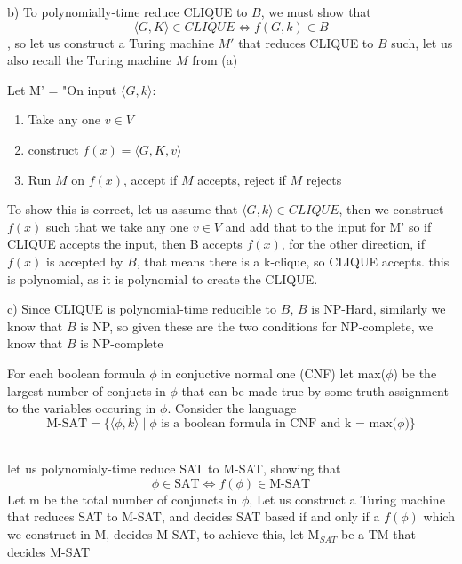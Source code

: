\documentclass[a4paper,addpoints
	]{exam}
\begin{document}
\begin{questions}
\begin{solutionbox}{}
    \vspace{2em}

    b) To polynomially-time reduce CLIQUE to $B$, we must show that 
    \[
	    \langle G,K\rangle \in CLIQUE \iff f(G,k) \in B
    \]
    , so let us construct a Turing machine $M'$ that reduces CLIQUE to $B$ such, let us also recall the Turing machine $M$ from (a)
    
    \vspace{2em}
    
    Let M' = "On input $\langle G,k\rangle$:
    \begin{enumerate}
        \item Take any one $v\in V$
        \item construct $f(x) = \langle G,K,v\rangle$
        \item Run $M$ on $f(x)$, accept if $M$ accepts, reject if $M$ rejects
    \end{enumerate}

    \vspace{2em}

    To show this is correct, let us assume that $\langle G,k\rangle \in CLIQUE$, then we construct $f(x)$ such that we take any one $v \in V$ and add that to the input for M' so if CLIQUE accepts the input,
    then B accepts $f(x)$, for the other direction, if $f(x)$ is accepted by $B$, that means there is a k-clique, so CLIQUE accepts. this is polynomial, as it is polynomial to create the CLIQUE.

    \vspace{2em}

    c) Since CLIQUE is polynomial-time reducible to $B$, $B$ is NP-Hard, similarly we know that $B$ is NP, so given these are the two conditions for NP-complete, we know that $B$ is NP-complete
    \end{solutionbox}
    
    \pagebreak
    
    \question[20] For each boolean formula $\phi$ in conjuctive normal one (CNF) let max($\phi$) be the largest number of conjucts in $\phi$ that can be made true by some truth assignment to the variables occuring in $\phi$.
    Consider the language 
    \[
    \text{M-SAT} = \{\langle \phi, k\rangle \mid \phi \text{ is a boolean formula in CNF and k = max($\phi$)}\}
	\]
   \begin{solutionbox}{} \\
    
    let us polynomialy-time reduce SAT to M-SAT, showing that 
    \[\phi\in\text{SAT}\iff f(\phi)\in\text{M-SAT}\]
    Let m be the total number of conjuncts in $\phi$, Let us construct a Turing machine that reduces SAT to M-SAT, and decides SAT based if and only if a $f(\phi)$ which we construct in M, decides M-SAT, to achieve this, let $\text{M}_{SAT}$ be a TM that decides M-SAT 


\end{solutionbox}
\end{questions}
\end{document}

